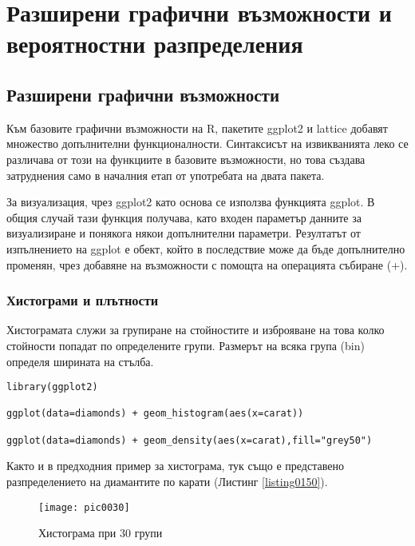 ﻿\newpage
\chapter{Разширени графични възможности и вероятностни разпределения}
\label{chapter08}

\section{Разширени графични възможности}

Към базовите графични възможности на R, пакетите ggplot2 и lattice добавят множество допълнителни функционалности. Синтаксисът на извикванията леко се различава от този на функциите в базовите възможности, но това създава затруднения само в началния етап от употребата на двата пакета. 

За визуализация, чрез ggplot2 като основа се използва функцията ggplot. В общия случай тази функция получава, като входен параметър данните за визуализиране и понякога някои допълнителни параметри. Резултатът от изпълнението на ggplot е обект, който в последствие може да бъде допълнително променян, чрез добавяне на възможности с помощта на операцията събиране (+). 

\subsection{Хистограми и плътности}

Хистограмата служи за групиране на стойностите и изброяване на това колко стойности попадат по определените групи. Размерът на всяка група (bin) определя ширината на стълба. 

\begin{lstlisting}[caption=Хистограма и плътност, label=listing0150]
library(ggplot2)

ggplot(data=diamonds) + geom_histogram(aes(x=carat))

ggplot(data=diamonds) + geom_density(aes(x=carat),fill="grey50")
\end{lstlisting}

Както и в предходния пример за хистограма, тук също е представено разпределението на диамантите по карати (Листинг \ref{listing0150}).

\begin{figure}[h!]
  \centering
  \texttt{[image: pic0030]}
  \caption{Хистограма при 30 групи}
\label{figure0030}
\end{figure}
\FloatBarrier

